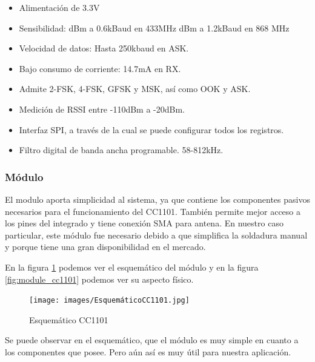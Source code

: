 \begin{itemize}
    \item Alimentación de 3.3V
    \item Sensibilidad: 
     dBm a 0.6kBaud en 433MHz
     dBm a 1.2kBaud en 868 MHz
    \item Velocidad de datos: Hasta 250kbaud en ASK.
    \item Bajo consumo de corriente: 14.7mA en RX.
    \item Admite 2-FSK, 4-FSK, GFSK y MSK, así como OOK y ASK.
    \item Medición de RSSI entre -110dBm a -20dBm.
    \item Interfaz SPI, a través de la cual se puede configurar todos los registros.
    \item Filtro digital de banda ancha programable. 58-812kHz.
\end{itemize}

\subsubsection{Módulo}

El modulo aporta simplicidad al sistema, ya que contiene los componentes pasivos necesarios para el funcionamiento del CC1101. También permite mejor acceso a los pines 
del integrado y tiene conexión SMA para antena. En nuestro caso particular, este módulo fue necesario debido a que simplifica la soldadura manual y porque
tiene una gran disponibilidad en el mercado.

En la figura \ref{fig:sch_cc1101} podemos ver el esquemático del módulo y en la figura \ref{fig:module_cc1101} podemos ver su aspecto físico.

\begin{figure}[htb]
	\centering
	\texttt{[image: images/EsquemáticoCC1101.jpg]}
    \caption{Esquemático CC1101}
	\label{fig:sch_cc1101}
\end{figure}

Se puede observar en el esquemático, que el módulo es muy simple en cuanto a los componentes que posee. Pero aún así es muy útil para nuestra aplicación.


